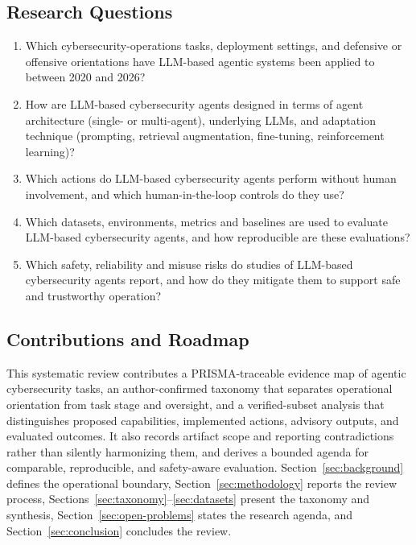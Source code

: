 \subsection{Research Questions}
\begin{enumerate}
  \item[RQ1.] Which cybersecurity-operations tasks, deployment settings, and defensive or offensive orientations have LLM-based agentic systems been applied to between 2020 and 2026?
  \item[RQ2.] How are LLM-based cybersecurity agents designed in terms of agent architecture (single- or multi-agent), underlying LLMs, and adaptation technique (prompting, retrieval augmentation, fine-tuning, reinforcement learning)?
  \item[RQ3.] Which actions do LLM-based cybersecurity agents perform without human involvement, and which human-in-the-loop controls do they use?
  \item[RQ4.] Which datasets, environments, metrics and baselines are used to evaluate LLM-based cybersecurity agents, and how reproducible are these evaluations?
  \item[RQ5.] Which safety, reliability and misuse risks do studies of LLM-based cybersecurity agents report, and how do they mitigate them to support safe and trustworthy operation?
\end{enumerate}

\subsection{Contributions and Roadmap}
This systematic review contributes a PRISMA-traceable evidence map of agentic cybersecurity tasks, an author-confirmed taxonomy that separates operational orientation from task stage and oversight, and a verified-subset analysis that distinguishes proposed capabilities, implemented actions, advisory outputs, and evaluated outcomes. It also records artifact scope and reporting contradictions rather than silently harmonizing them, and derives a bounded agenda for comparable, reproducible, and safety-aware evaluation. Section~\ref{sec:background} defines the operational boundary, Section~\ref{sec:methodology} reports the review process, Sections~\ref{sec:taxonomy}--\ref{sec:datasets} present the taxonomy and synthesis, Section~\ref{sec:open-problems} states the research agenda, and Section~\ref{sec:conclusion} concludes the review.
